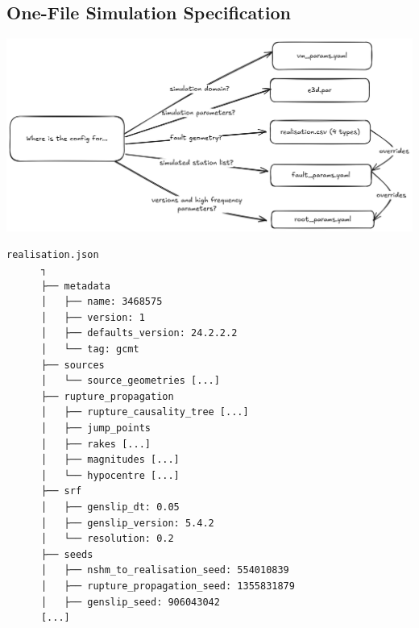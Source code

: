 \documentclass[11pt]{article}
\begin{document}
\subsection*{One-File Simulation Specification}
\label{sec:org35fd8f7}
\begin{center}
\includegraphics[width=.9\linewidth]{config.png}
\end{center}
\begin{verbatim}
realisation.json
      ┐
      ├── metadata
      │   ├── name: 3468575
      │   ├── version: 1
      │   ├── defaults_version: 24.2.2.2
      │   └── tag: gcmt
      ├── sources
      │   └── source_geometries [...]
      ├── rupture_propagation
      │   ├── rupture_causality_tree [...]
      │   ├── jump_points
      │   ├── rakes [...]
      │   ├── magnitudes [...]
      │   └── hypocentre [...]
      ├── srf
      │   ├── genslip_dt: 0.05
      │   ├── genslip_version: 5.4.2
      │   └── resolution: 0.2
      ├── seeds
      │   ├── nshm_to_realisation_seed: 554010839
      │   ├── rupture_propagation_seed: 1355831879
      │   ├── genslip_seed: 906043042
      [...]
\end{verbatim}
\end{document}

